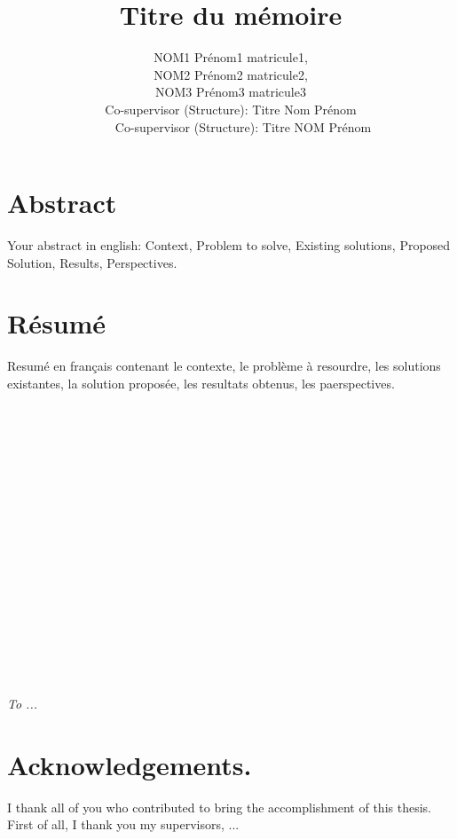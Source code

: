 \documentclass[a4paper,twoside,12pt]{book}
\title{Titre du mémoire}
\author{NOM1 Prénom1 matricule1, \\ NOM2 Prénom2 matricule2,  \\ NOM3 Prénom3 matricule3 \\Co-supervisor (Structure): Titre Nom Prénom\\ \ \ \ \ Co-supervisor (Structure): Titre NOM Prénom}
\begin{document}

\maketitle



{\fontsize{10.46}{13}\selectfont
\section*{Abstract}
Your abstract in english: Context, Problem to solve, Existing solutions, Proposed Solution, Results, Perspectives. 
}
\newpage
{\fontsize{10.46}{13}\selectfont
\section*{Résumé}

Resumé en français contenant le contexte, le problème à resourdre, les solutions existantes, la solution proposée, les resultats obtenus, les paerspectives.
}
\newpage
\ \\ \ \\ \ \\ \ \\ \ \\ \ \\ \ \\ \ \\ \ \\ \ \\ \ \\ \ \\ \ \\ \ \\ \ \\ \ \\
\begin{center}
\textit{
 To ...}
\end{center}

\newpage

\section*{Acknowledgements.}

I thank all of you who contributed to bring the accomplishment of this thesis. First of all, I thank you my supervisors, ...
\end{document}
